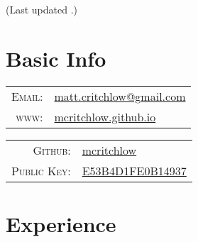 \documentclass[letterpaper,10pt]{article}
\author{Matthew Critchlow}
\date{\today}
\renewcommand{\maketitle}{
\par{\centering{\Huge  \textsc{\theauthor}}\par}
{\footnotesize\hfill{}\color{lightgray}(Last updated \thedate.)}}
\begin{document}
\maketitle

\section{Basic Info}

\vspace{.25cm}

\begin{minipage}[t]{.5\linewidth}

\begin{tabular}{rp{.75\linewidth}}
    \textsc{Email:}     & \href{mailto:matt.critchlow@gmail.com}{matt.critchlow@gmail.com}\\
    \textsc{www:}&\href{https://mcritchlow.github.io}{mcritchlow.github.io}
\end{tabular}
\end{minipage}
\begin{minipage}[t]{.5\linewidth}
\begin{tabular}{rl}
\textsc{Github:} & \href{http://github.com/mcritchlow}{mcritchlow}\\
\textsc{Public Key:}&\href{http://pgp.mit.edu/pks/lookup?op=get&search=0xE53B4D1FE0B14937}{E53B4D1FE0B14937}
\end{tabular}
\end{minipage}

\vspace{.25cm}

\section{Experience}
\end{document}
